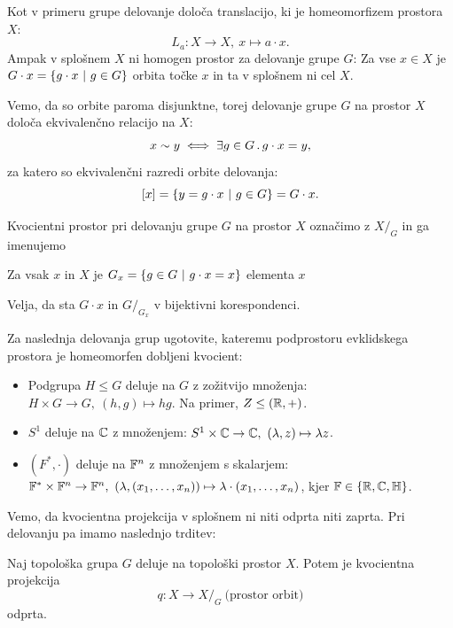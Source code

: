 \begin{opomba}
    Kot v primeru grupe delovanje določa translacijo, ki je homeomorfizem prostora \(X\): 
    \[L_a: X \to X, \ x \mapsto a \cdot x.\]
    Ampak v splošnem \(X\) ni homogen prostor za delovanje grupe \(G\): Za vse \(x \in X\) je \(G \cdot x = \left\{g \cdot x \ | \ g \in G\right\}\) orbita točke \(x\) in ta v splošnem ni cel \(X\). 
\end{opomba}

Vemo, da so orbite paroma disjunktne, torej delovanje grupe \(G\) na prostor \(X\) določa ekvivalenčno relacijo na \(X\):
\[x \sim y \iff \exists g \in G \,.\, g \cdot x = y,\]
za katero so ekvivalenčni razredi orbite delovanja:
\[[x] = \left\{y = g \cdot x \ | \ g \in G\right\} = G \cdot x.\]
%
\begin{definicija}
    Kvocientni prostor pri delovanju grupe \(G\) na prostor \(X\) označimo z \(X/_G\) in ga imenujemo 
\end{definicija}

\begin{definicija}
    Za vsak \(x\) in \(X\) je \(G_x = \left\{g \in G \ | \ g \cdot x = x\right\}\)  elementa \(x\)
\end{definicija}

\begin{opomba}
    Velja, da sta \(G \cdot x\) in \(G/_{G_x}\) v bijektivni korespondenci.
\end{opomba}

\begin{primer}
    Za naslednja delovanja grup ugotovite, kateremu podprostoru evklidskega prostora je homeomorfen dobljeni kvocient:
    \begin{itemize}
        \item Podgrupa \(H \leq G\) deluje na \(G\) z zožitvijo množenja: \(H \times G \to G, \ (h, g) \mapsto hg\). Na primer, \(Z \leq (\mathbb{R}, +)\).
        \item \(S^1\) deluje na \(\mathbb{C}\) z množenjem: \(S^1 \times \mathbb{C} \to \mathbb{C}, \ (\lambda, z) \mapsto \lambda z\).
        \item \((F^*, \cdot)\) deluje na \(\mathbb{F}^n\) z množenjem s skalarjem: \(\F^* \times \F^n \to \F^n, \ (\lambda, (x_1, \ldots, x_n)) \mapsto \lambda \cdot (x_1, \ldots, x_n)\), kjer \(\mathbb{F} \in \left\{\mathbb{R}, \mathbb{C}, \mathbb{H}\right\}\). 
    \end{itemize}
\end{primer}

Vemo, da kvocientna projekcija v splošnem ni niti odprta niti zaprta. Pri delovanju pa imamo naslednjo trditev:
\begin{trditev}
    Naj topološka grupa \(G\) deluje na topološki prostor \(X\). Potem je kvocientna projekcija 
    \[q: X \to X/_G \ \text{(prostor orbit)}\]
    odprta.
\end{trditev}

